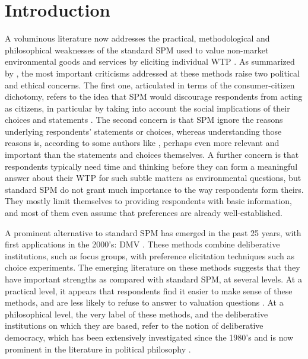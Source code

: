 \documentclass[version=3.21, pagesize, twoside=off, bibliography=totoc, DIV=calc, fontsize=12pt, a4paper, french, english]{scrartcl}
\begin{document}
\section{Introduction}
A voluminous literature now addresses the practical, methodological and philosophical weaknesses of the standard \ac{SPM} used to value non-market environmental goods and services by eliciting individual \ac{WTP} \citep{meinard_ethical_2016}. 
As summarized by \citet{bartkowski_beyond_2018, bartkowski_deliberative_2019}, the most important criticisms addressed at these methods raise two political and ethical concerns. 
The first one, articulated in terms of the consumer-citizen dichotomy, refers to the idea that \ac{SPM} would discourage respondents from acting as citizens, in particular by taking into account the social implications of their choices and statements \citep{soma_representing_2014, vatn_institutional_2009}. 
The second concern is that \ac{SPM} ignore the reasons underlying respondents’ statements or choices, whereas understanding those reasons is, according to some authors like \citet{sen_environmental_1995}, perhaps even more relevant and important than the statements and choices themselves. A further concern is that respondents typically need time and thinking before they can form a meaningful answer about their \ac{WTP} for such subtle matters as environmental questions, but standard \ac{SPM} do not grant much importance to the way respondents form theirs. They mostly limit themselves to providing respondents with basic information, and most of them even assume that preferences are already well-established.

A prominent alternative to standard \ac{SPM} has emerged in the past 25 years, with first applications in the 2000's: \ac{DMV} \citep{spash_deliberative_2007,bartkowski_economic_2017}. 
These methods combine deliberative institutions, such as focus groups, with preference elicitation techniques such as choice experiments. 
The emerging literature on these methods suggests that they have important strengths as compared with standard \ac{SPM}, at several levels. 
At a practical level, it appears that respondents find it easier to make sense of these methods, and are less likely to refuse to answer to valuation questions \citep{lienhoop_contingent_2007,szabo_reducing_2011}. 
At a philosophical level, the very label of these methods, and the deliberative institutions on which they are based, refer to the notion of deliberative democracy, which has been extensively investigated since the 1980's and is now prominent in the literature in political philosophy \citep{chappell_deliberative_2012}.
\end{document}
